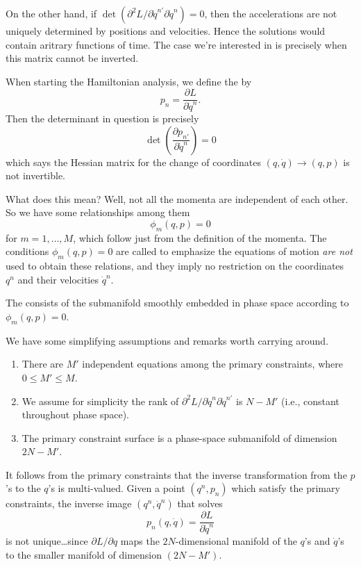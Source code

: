 \M
On the other hand, if
$\det(\partial^{2}L/\partial\dot{q}^{n'}\partial\dot{q}^{n})=0$, then the
accelerations are not uniquely determined by positions and
velocities. Hence the solutions would contain aritrary functions of
time. The case we're interested in is precisely when this matrix cannot
be inverted.

When starting the Hamiltonian analysis, we define the 
by
\begin{equation}
  p_{n}=\frac{\partial L}{\partial\dot{q}^{n}}.
\end{equation}
Then the determinant in question is precisely
\begin{equation}
  \det\left(\frac{\partial p_{n'}}{\partial\dot{q}^{n}}\right)=0
\end{equation}
which says the Hessian matrix for the change of coordinates
$(q,\dot{q})\to(q,p)$ is not invertible.

What does this mean? Well, not all the momenta are independent of each
other. So we have some relationships among them
\begin{equation}
  \phi_{m}(q,p)=0
\end{equation}
for $m=1,\dots,M$, which follow just from the definition of the
momenta. The conditions $\phi_{m}(q,p)=0$ are called  to emphasize the equations of motion \emph{are not} used
to obtain these relations, and they imply no restriction on the
coordinates $q^{n}$ and their velocities $\dot{q}^{n}$.

The  consists of the submanifold
smoothly embedded in phase space according to $\phi_{m}(q,p)=0$.

We have some simplifying assumptions and remarks worth carrying around.
\begin{enumerate}
\item There are $M'$ independent equations among the primary
  constraints, where $0\leq M'\leq M$.
\item We assume for simplicity the rank of
  $\partial^{2}L/\partial\dot{q}^{n}\partial\dot{q}^{n'}$ is $N-M'$
  (i.e., constant throughout phase space).
\item The primary constraint surface is a phase-space submanifold of
  dimension $2N-M'$.
\end{enumerate}

\M
It follows from the primary constraints that the inverse transformation
from the $p$'s to the $q$'s is multi-valued. Given a point $(q^{n}, p_{n})$
which satisfy the primary constraints, the inverse image $(q^{n}, \dot{q}^{n})$
that solves
\begin{equation}
  p_{n}(q,\dot{q}) = \frac{\partial L}{\partial\dot{q}^{n}}
\end{equation}
is not unique\dots since $\partial L/\partial q$ maps the
$2N$-dimensional manifold of the $q$'s and $\dot{q}$'s to the smaller
manifold of dimension $(2N-M')$.

